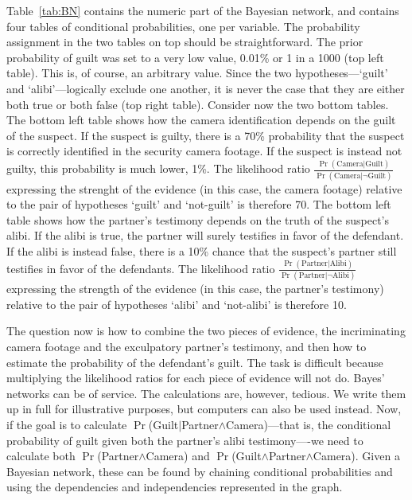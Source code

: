 \documentclass[10pt]{article}
\begin{document}
Table~\ref{tab:BN} contains the numeric part of the Bayesian network, and contains four tables of conditional probabilities, one per variable. 
The probability assignment in the two tables on top should be straightforward. The prior probability of guilt was set to a very low value, 0.01\% or 1 in a 1000 (top left table). 
This is, of course, an arbitrary value. Since the two hypotheses---`guilt' and `alibi'---logically exclude one another, it is never the case that they are 
either both true or both false (top right table). Consider now the two bottom tables. 
The bottom left table shows how the camera identification depends on the guilt of the suspect. If the suspect is guilty, 
there is a 70\% probability that the suspect is correctly identified in the security camera footage. 
If the suspect is instead not guilty, this probability is much lower, 1\%. The likelihood ratio $\frac{\Pr(\text{Camera} | \text{Guilt})}{\Pr(\text{Camera} | \neg \text{Guilt})}$ 
expressing the strenght of the evidence (in this case, the camera footage) relative to the pair of hypotheses `guilt' and `not-guilt' 
is therefore 70.
The bottom left table shows how the partner's testimony depends on the truth of the suspect's alibi.
If the alibi is true, the partner will surely testifies in favor of the defendant. If the alibi is instead false, there is a 10\% chance that 
the suspect's partner still testifies in favor of the defendants. The likelihood ratio $\frac{\Pr(\text{Partner} | \text{Alibi})}{\Pr(\text{Partner} | \neg \text{Alibi})}$ 
expressing the strength of the evidence (in this case, the partner's testimony) relative to the pair of hypotheses `alibi' and `not-alibi' 
is therefore 10.

The question now is how to combine the two pieces of evidence, the incriminating camera footage and the exculpatory partner's testimony, 
and then how to estimate the probability of the defendant's guilt. The task is difficult because multiplying the likelihood 
ratios for each piece of evidence will not do. Bayes' networks can be of service. The calculations are, however, tedious. 
We write them up in full for illustrative purposes, but computers can also be used instead. 
Now, if the goal is to calculate $\Pr$(Guilt$|$Partner$ \land $Camera)---that is, the conditional probability of guilt given 
both the partner's alibi testimony----we need to calculate both $\Pr$(Partner$ \land $Camera) 
and $\Pr$(Guilt$ \land $Partner$ \land $Camera). 
Given a Bayesian network, these can be found by chaining conditional probabilities and using the dependencies and independencies represented in the graph. 
\end{document}
